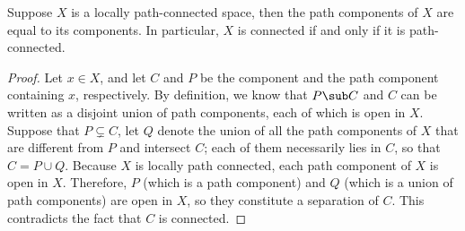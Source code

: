 \begin{proposition}
Suppose $X$ is a locally path-connected space, then the path components of $X$ are equal to its components. In particular, $X$ is connected if and only if it is path-connected.
\end{proposition}
\begin{proof}
Let $x\in X$, and let $C$ and $P$ be the component and the path component containing $x$, respectively. By definition, we know that $P\sub C$ and $C$ can be written as a disjoint union of path components, each of which is open in $X$. Suppose that $P\subsetneq C$, let $Q$ denote the union of all the path components of $X$ that are different from $P$ and intersect $C$; each of them necessarily lies in $C$, so that $C=P\cup Q$. Because $X$ is locally path connected, each path component of $X$ is open in $X$. Therefore, $P$ (which is a path component) and $Q$ (which is a union of path components) are open in $X$, so they constitute a separation of $C$. This contradicts the fact that $C$ is connected.
\end{proof}
